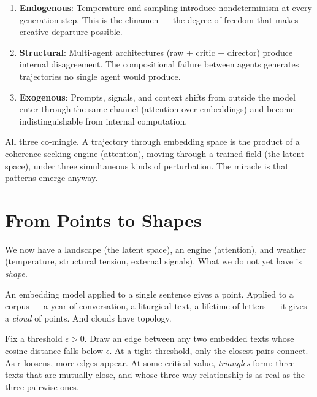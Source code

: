 \documentclass[12pt,a4paper]{article}
\begin{document}
\begin{formalbox}[title={Three Sources of Weather}]
\begin{enumerate}
\item \textbf{Endogenous}: Temperature and sampling introduce nondeterminism at every generation step. This is the clinamen --- the degree of freedom that makes creative departure possible.
\item \textbf{Structural}: Multi-agent architectures (raw + critic + director) produce internal disagreement. The compositional failure between agents generates trajectories no single agent would produce.
\item \textbf{Exogenous}: Prompts, signals, and context shifts from outside the model enter through the same channel (attention over embeddings) and become indistinguishable from internal computation.
\end{enumerate}
All three co-mingle. A trajectory through embedding space is the product of a coherence-seeking engine (attention), moving through a trained field (the latent space), under three simultaneous kinds of perturbation. The miracle is that patterns emerge anyway.
\end{formalbox}


\section{From Points to Shapes}

We now have a landscape (the latent space), an engine (attention), and weather (temperature, structural tension, external signals). What we do not yet have is \emph{shape}.

An embedding model applied to a single sentence gives a point. Applied to a corpus --- a year of conversation, a liturgical text, a lifetime of letters --- it gives a \emph{cloud} of points. And clouds have topology.

Fix a threshold $\epsilon > 0$. Draw an edge between any two embedded texts whose cosine distance falls below $\epsilon$. At a tight threshold, only the closest pairs connect. As $\epsilon$ loosens, more edges appear. At some critical value, \emph{triangles} form: three texts that are mutually close, and whose three-way relationship is as real as the three pairwise ones.
\end{document}
